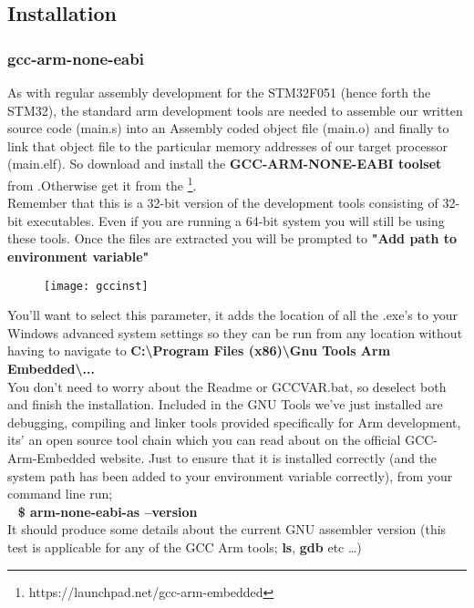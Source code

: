 \subsection{Installation}
\label{subsec:inst}
\subsubsection{gcc-arm-none-eabi}
As with regular assembly development for the STM32F051 (hence forth the STM32), the standard arm development tools are needed to assemble our written source code (main.s) into an Assembly coded object file (main.o) and finally to link that object file to the particular memory addresses of our target processor (main.elf). 
So download and install the \textbf{GCC-ARM-NONE-EABI toolset} from {\color{Blue}\underline{}}.Otherwise get it from the  {\color{Blue}\underline{}}\footnote{https://launchpad.net/gcc-arm-embedded}.
\\
Remember that this is a 32-bit version of the development tools consisting of 32-bit executables. Even if you are running a 64-bit system you will still be using these tools. Once the files are extracted you will be prompted to \textbf{\color{Purple}"Add path to environment variable"}
\begin{figure}[hbtp]
\centering
\texttt{[image: gccinst]}
\end{figure}
\newpage
You'll want to select this parameter, it adds the location of all the .exe's to your Windows advanced system settings so they can be run from any location without having to navigate to \textbf{\color{Aquamarine} C:\textbackslash Program Files (x86)\textbackslash Gnu Tools Arm Embedded\textbackslash ... }
\\
You don't need to worry about the Readme or GCCVAR.bat, so deselect both and finish the installation. Included in the GNU Tools we've just installed are debugging, compiling and linker tools provided specifically for Arm development, its' an open source tool chain which you can read about on the official GCC-Arm-Embedded website. Just to ensure that it is installed correctly (and the system path has been added to your environment variable correctly), from your command line run;
\\
\-\ \hspace{20pt} \textbf{\color{YellowGreen} \$  arm-none-eabi-as --version}
\\
It should produce some details about the current GNU assembler version (this test is applicable for any of the GCC Arm tools; \textbf{ls}, \textbf{gdb} etc \ldots)

